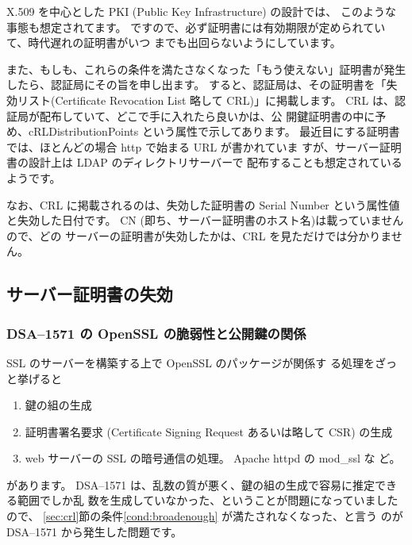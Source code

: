 \documentclass[mingoth,a4paper]{jsarticle}
\begin{document}
X.509 を中心とした PKI (Public Key Infrastructure) の設計では、
このような事態も想定されてます。
ですので、必ず証明書には有効期限が定められていて、時代遅れの証明書がいつ
までも出回らないようにしています。

また、もしも、これらの条件を満たさなくなった「もう使えない」証明書が発生
したら、認証局にその旨を申し出ます。
すると、認証局は、その証明書を「失効リスト(Certificate
Revocation List 略して CRL)」に掲載します。
CRL は、認証局が配布していて、どこで手に入れたら良いかは、公
開鍵証明書の中に予め、cRLDistributionPoints という属性で示してあります。
最近目にする証明書では、ほとんどの場合 http で始まる URL が書かれていま
すが、サーバー証明書の設計上は LDAP のディレクトリサーバーで
配布することも想定されているようです。

なお、CRL に掲載されるのは、失効した証明書の Serial
Number という属性値と失効した日付です。
CN (即ち、サーバー証明書のホスト名)は載っていませんので、どの
サーバーの証明書が失効したかは、CRL を見ただけでは分かりません。

\subsection{サーバー証明書の失効}
\subsubsection{DSA--1571 の OpenSSL の脆弱性と公開鍵の関係}

SSL のサーバーを構築する上で OpenSSL のパッケージが関係す
る処理をざっと挙げると
\begin{enumerate}
\item 鍵の組の生成
\item 証明書署名要求 (Certificate Signing Request あるいは略して
      CSR) の生成
\item web サーバーの SSL の暗号通信の処理。 Apache httpd の mod\_ssl な
      ど。
\end{enumerate}
があります。
DSA--1571 は、乱数の質が悪く、鍵の組の生成で容易に推定できる範囲でしか乱
数を生成していなかった、ということが問題になっていましたので、
\ref{sec:crl}節の条件\ref{cond:broadenough} が満たされなくなった、と言う
のが DSA--1571 から発生した問題です。
\end{document}
